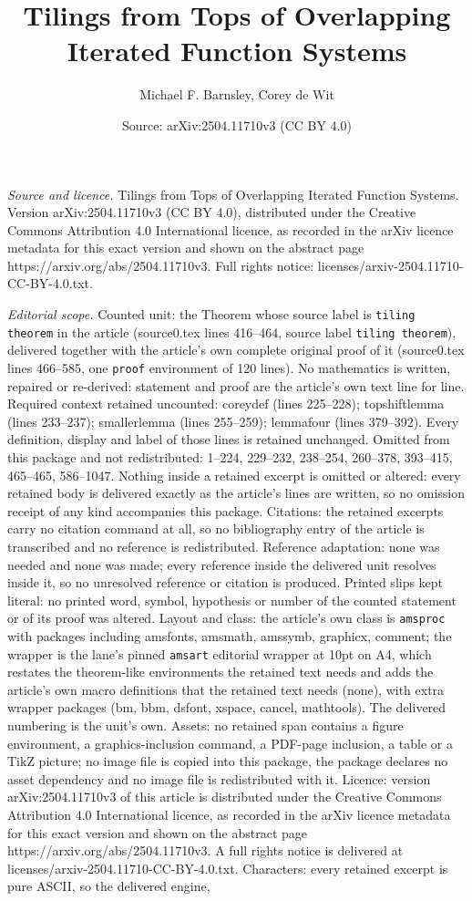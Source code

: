 \documentclass[10pt,a4paper]{amsart}
\title[Tilings from Tops of Overlapping Iterated Function Systems]{Tilings from Tops of Overlapping Iterated Function Systems}
\author{Michael F. Barnsley, Corey de Wit}
\date{Source: arXiv:2504.11710v3 (CC BY 4.0)}
\begin{document}
\maketitle

\noindent\emph{Source and licence.} Tilings from Tops of Overlapping Iterated Function Systems. Version arXiv:2504.11710v3 (CC BY 4.0), distributed under the Creative Commons Attribution 4.0 International licence, as recorded in the arXiv licence metadata for this exact version and shown on the abstract page https://arxiv.org/abs/2504.11710v3. Full rights notice: licenses/arxiv-2504.11710-CC-BY-4.0.txt.\par\smallskip

\noindent\textit{Editorial scope.} Counted unit: the Theorem whose source label is \texttt{tiling theorem} in the article (source0.tex lines 416--464, source label \texttt{tiling theorem}), delivered together with the article's own complete original proof of it (source0.tex lines 466--585, one \texttt{proof} environment of 120 lines). No mathematics is written, repaired or re-derived: statement and proof are the article's own text line for line. Required context retained uncounted: coreydef (lines 225--228); topshiftlemma (lines 233--237); smallerlemma (lines 255--259); lemmafour (lines 379--392). Every definition, display and label of those lines is retained unchanged. Omitted from this package and not redistributed: 1--224, 229--232, 238--254, 260--378, 393--415, 465--465, 586--1047. Nothing inside a retained excerpt is omitted or altered: every retained body is delivered exactly as the article's lines are written, so no omission receipt of any kind accompanies this package. Citations: the retained excerpts carry no citation command at all, so no bibliography entry of the article is transcribed and no reference is redistributed. Reference adaptation: none was needed and none was made; every reference inside the delivered unit resolves inside it, so no unresolved reference or citation is produced. Printed slips kept literal: no printed word, symbol, hypothesis or number of the counted statement or of its proof was altered. Layout and class: the article's own class is \texttt{amsproc} with packages including amsfonts, amsmath, amssymb, graphicx, comment; the wrapper is the lane's pinned \texttt{amsart} editorial wrapper at 10pt on A4, which restates the theorem-like environments the retained text needs and adds the article's own macro definitions that the retained text needs (none), with extra wrapper packages (bm, bbm, dsfont, xspace, cancel, mathtools). The delivered numbering is the unit's own. Assets: no retained span contains a figure environment, a graphics-inclusion command, a PDF-page inclusion, a table or a TikZ picture; no image file is copied into this package, the package declares no asset dependency and no image file is redistributed with it. Licence: version arXiv:2504.11710v3 of this article is distributed under the Creative Commons Attribution 4.0 International licence, as recorded in the arXiv licence metadata for this exact version and shown on the abstract page https://arxiv.org/abs/2504.11710v3. A full rights notice is delivered at licenses/arxiv-2504.11710-CC-BY-4.0.txt. Characters: every retained excerpt is pure ASCII, so the delivered engine, 
\end{document}
